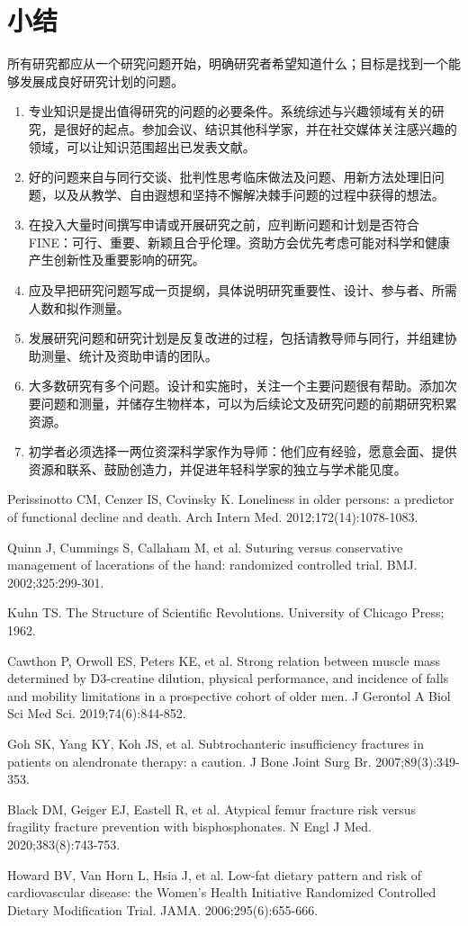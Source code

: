 \section{小结}
所有研究都应从一个研究问题开始，明确研究者希望知道什么；目标是找到一个能够发展成良好研究计划的问题。
\begin{enumerate}
\item 专业知识是提出值得研究的问题的必要条件。系统综述与兴趣领域有关的研究，是很好的起点。参加会议、结识其他科学家，并在社交媒体关注感兴趣的领域，可以让知识范围超出已发表文献。
\item 好的问题来自与同行交谈、批判性思考临床做法及问题、用新方法处理旧问题，以及从教学、自由遐想和坚持不懈解决棘手问题的过程中获得的想法。
\item 在投入大量时间撰写申请或开展研究之前，应判断问题和计划是否符合 FINE：可行、重要、新颖且合乎伦理。资助方会优先考虑可能对科学和健康产生创新性及重要影响的研究。
\item 应及早把研究问题写成一页提纲，具体说明研究重要性、设计、参与者、所需人数和拟作测量。
\item 发展研究问题和研究计划是反复改进的过程，包括请教导师与同行，并组建协助测量、统计及资助申请的团队。
\item 大多数研究有多个问题。设计和实施时，关注一个主要问题很有帮助。添加次要问题和测量，并储存生物样本，可以为后续论文及研究问题的前期研究积累资源。
\item 初学者必须选择一两位资深科学家作为导师：他们应有经验，愿意会面、提供资源和联系、鼓励创造力，并促进年轻科学家的独立与学术能见度。
\end{enumerate}

\begin{references}
\item Perissinotto CM, Cenzer IS, Covinsky K. Loneliness in older persons: a predictor of functional decline and death. Arch Intern Med. 2012;172(14):1078-1083.
\item Quinn J, Cummings S, Callaham M, et al. Suturing versus conservative management of lacerations of the hand: randomized controlled trial. BMJ. 2002;325:299-301.
\item Kuhn TS. The Structure of Scientific Revolutions. University of Chicago Press; 1962.
\item Cawthon P, Orwoll ES, Peters KE, et al. Strong relation between muscle mass determined by D3-creatine dilution, physical performance, and incidence of falls and mobility limitations in a prospective cohort of older men. J Gerontol A Biol Sci Med Sci. 2019;74(6):844-852.
\item Goh SK, Yang KY, Koh JS, et al. Subtrochanteric insufficiency fractures in patients on alendronate therapy: a caution. J Bone Joint Surg Br. 2007;89(3):349-353.
\item Black DM, Geiger EJ, Eastell R, et al. Atypical femur fracture risk versus fragility fracture prevention with bisphosphonates. N Engl J Med. 2020;383(8):743-753.
\item Howard BV, Van Horn L, Hsia J, et al. Low-fat dietary pattern and risk of cardiovascular disease: the Women’s Health Initiative Randomized Controlled Dietary Modification Trial. JAMA. 2006;295(6):655-666.
\end{references}

